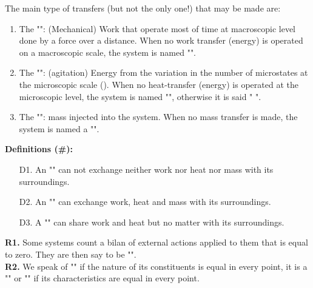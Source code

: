 	The main type of transfers (but not the only one!) that may be made are:
	\begin{enumerate}
		\item The "":  (Mechanical) Work that operate most of time at macroscopic level done by a force over a distance. When no work  transfer (energy) is operated on a macroscopic scale, the system is named "".
		
		\item The "": (agitation) Energy from the variation in the number of microstates at the microscopic scale (). When no heat-transfer (energy) is operated at the microscopic level, the system is named "", otherwise it is said " ".
		
		\item The "": mass injected into the system. When no mass transfer is made, the system is named a "".
	\end{enumerate}
	
	\textbf{Definitions (\#\mydef):}
	\begin{enumerate}
		\item[D1.] An "" can not exchange neither work nor heat nor mass with its surroundings.

		\item[D2.] An "" can exchange work, heat and mass with its  surroundings.

		\item[D3.] A "" can share work and heat but no matter with its  surroundings.
	\end{enumerate}
	\begin{tcolorbox}[title=Remarks,colframe=black,arc=10pt]
	\textbf{R1.} Some systems count a bilan of external actions applied to them that is equal to zero. They are then say to be "".\\
	
	\textbf{R2.} We speak of "" if the nature of its constituents is equal in every point, it is a "" or "" if its characteristics are equal in every point.
	\end{tcolorbox}
	
